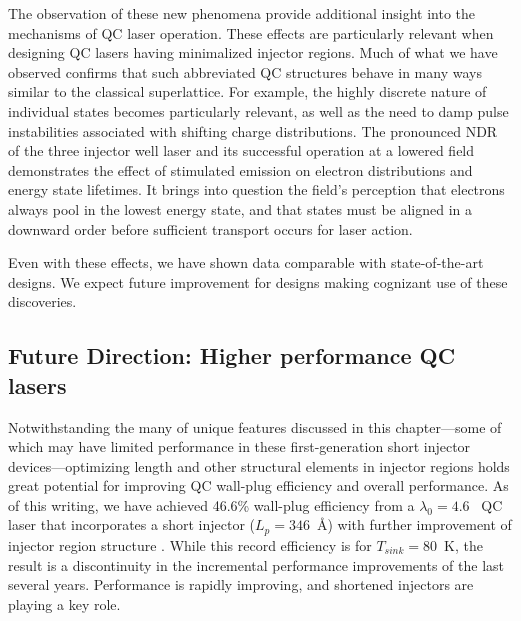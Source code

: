 The observation of these new phenomena provide additional insight into the mechanisms of QC laser operation.  These effects are particularly relevant when designing QC lasers having minimalized injector regions.  Much of what we have observed confirms that such abbreviated QC structures behave in many ways similar to the classical superlattice.  For example, the highly discrete nature of individual states becomes particularly relevant, as well as the need to damp pulse instabilities \cite{Savvidis:PRL:2004} associated with shifting charge distributions.  The pronounced NDR of the three injector well laser and its successful operation at a lowered field demonstrates the effect of stimulated emission on electron distributions and energy state lifetimes.  It brings into question the field's perception that electrons always pool in the lowest energy state, and that states must be aligned in a downward order before sufficient transport occurs for laser action.



Even with these effects, we have shown data comparable with state-of-the-art designs.  We expect future improvement for designs making cognizant use of these discoveries.

\subsection{Future Direction: Higher performance QC lasers}

Notwithstanding the many of unique features discussed in this chapter---some of which may have limited performance in these first-generation short injector devices---optimizing length and other structural elements in injector regions holds great potential for improving QC wall-plug efficiency and overall performance.  As of this writing, we have achieved 46.6\% wall-plug efficiency from a $\lambda_0=4.6$ \um\ QC laser that incorporates a short injector ($L_p=346$~\AA) with further improvement of injector region structure \cite{Khurgin:APL:2009}.  While this record efficiency is for $T_{sink}=80$~K, the result is a discontinuity in the incremental performance improvements of the last several years.  Performance is rapidly improving, and shortened injectors are playing a key role.


